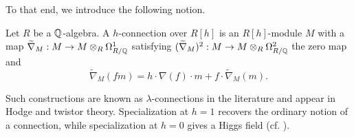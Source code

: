 To that end, we introduce the following notion. 
\begin{definition}[$h$-Connections]\label{def: h-connection}
    Let $R$ be a $\mathbb{Q}$-algebra. A $h$-connection over $R[h]$ is an $R[h]$-module $M$ with a map $\widetilde{\nabla}_{M}:M\to M\otimes_{R}\Omega^{1}_{R/\mathbb{Q}}$ satisfying $(\widetilde{\nabla}_{M})^{2}:M\to M\otimes_{R}\Omega^{2}_{R/\mathbb{Q}}$ the zero map and 
    $$\widetilde{\nabla}_{M}(fm)=h\cdot\nabla(f)\cdot m+f\cdot\widetilde{\nabla}_{M}(m).$$
\end{definition}
\begin{remark}
    Such constructions are known as $\lambda$-connections in the literature and appear in Hodge and twistor theory. Specialization at $h=1$ recovers the ordinary notion of a connection, while specialization at $h=0$ gives a Higgs field (cf. \cite[\S 2.3]{MorrowTsuji}). 
\end{remark} 

